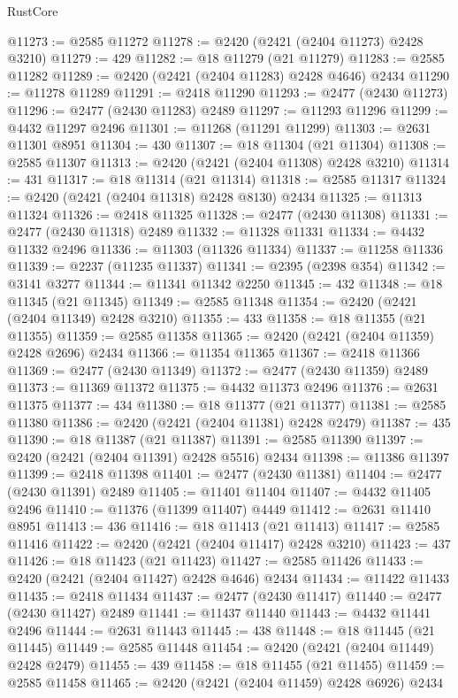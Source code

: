 \begin{lexlean}{RustCore}
\begin{coremodule}
@11273 := @2585 @11272
@11278 := @2420 (@2421 (@2404 @11273) @2428 @3210)
@11279 := 429
@11282 := @18 @11279 (@21 @11279)
@11283 := @2585 @11282
@11289 := @2420 (@2421 (@2404 @11283) @2428 @4646) @2434
@11290 := @11278 @11289
@11291 := @2418 @11290
@11293 := @2477 (@2430 @11273)
@11296 := @2477 (@2430 @11283) @2489
@11297 := @11293 @11296
@11299 := @4432 @11297 @2496
@11301 := @11268 (@11291 @11299)
@11303 := @2631 @11301 @8951
@11304 := 430
@11307 := @18 @11304 (@21 @11304)
@11308 := @2585 @11307
@11313 := @2420 (@2421 (@2404 @11308) @2428 @3210)
@11314 := 431
@11317 := @18 @11314 (@21 @11314)
@11318 := @2585 @11317
@11324 := @2420 (@2421 (@2404 @11318) @2428 @8130) @2434
@11325 := @11313 @11324
@11326 := @2418 @11325
@11328 := @2477 (@2430 @11308)
@11331 := @2477 (@2430 @11318) @2489
@11332 := @11328 @11331
@11334 := @4432 @11332 @2496
@11336 := @11303 (@11326 @11334)
@11337 := @11258 @11336
@11339 := @2237 (@11235 @11337)
@11341 := @2395 (@2398 @354)
@11342 := @3141 @3277
@11344 := @11341 @11342 @2250
@11345 := 432
@11348 := @18 @11345 (@21 @11345)
@11349 := @2585 @11348
@11354 := @2420 (@2421 (@2404 @11349) @2428 @3210)
@11355 := 433
@11358 := @18 @11355 (@21 @11355)
@11359 := @2585 @11358
@11365 := @2420 (@2421 (@2404 @11359) @2428 @2696) @2434
@11366 := @11354 @11365
@11367 := @2418 @11366
@11369 := @2477 (@2430 @11349)
@11372 := @2477 (@2430 @11359) @2489
@11373 := @11369 @11372
@11375 := @4432 @11373 @2496
@11376 := @2631 @11375
@11377 := 434
@11380 := @18 @11377 (@21 @11377)
@11381 := @2585 @11380
@11386 := @2420 (@2421 (@2404 @11381) @2428 @2479)
@11387 := 435
@11390 := @18 @11387 (@21 @11387)
@11391 := @2585 @11390
@11397 := @2420 (@2421 (@2404 @11391) @2428 @5516) @2434
@11398 := @11386 @11397
@11399 := @2418 @11398
@11401 := @2477 (@2430 @11381)
@11404 := @2477 (@2430 @11391) @2489
@11405 := @11401 @11404
@11407 := @4432 @11405 @2496
@11410 := @11376 (@11399 @11407) @4449
@11412 := @2631 @11410 @8951
@11413 := 436
@11416 := @18 @11413 (@21 @11413)
@11417 := @2585 @11416
@11422 := @2420 (@2421 (@2404 @11417) @2428 @3210)
@11423 := 437
@11426 := @18 @11423 (@21 @11423)
@11427 := @2585 @11426
@11433 := @2420 (@2421 (@2404 @11427) @2428 @4646) @2434
@11434 := @11422 @11433
@11435 := @2418 @11434
@11437 := @2477 (@2430 @11417)
@11440 := @2477 (@2430 @11427) @2489
@11441 := @11437 @11440
@11443 := @4432 @11441 @2496
@11444 := @2631 @11443
@11445 := 438
@11448 := @18 @11445 (@21 @11445)
@11449 := @2585 @11448
@11454 := @2420 (@2421 (@2404 @11449) @2428 @2479)
@11455 := 439
@11458 := @18 @11455 (@21 @11455)
@11459 := @2585 @11458
@11465 := @2420 (@2421 (@2404 @11459) @2428 @6926) @2434

\end{coremodule}
\end{lexlean}
